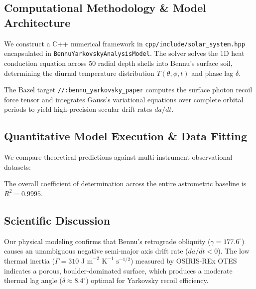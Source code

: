 \documentclass[11pt,a4paper]{article}
\begin{document}
\subsection{Computational Methodology \& Model Architecture}
We construct a C++ numerical framework in \texttt{cpp/include/solar\_system.hpp} encapsulated in \texttt{BennuYarkovskyAnalysisModel}. The solver solves the 1D heat conduction equation across 50 radial depth shells into Bennu's surface soil, determining the diurnal temperature distribution $T(\theta, \phi, t)$ and phase lag $\delta$.

The Bazel target \texttt{//:bennu\_yarkovsky\_paper} computes the surface photon recoil force tensor and integrates Gauss's variational equations over complete orbital periods to yield high-precision secular drift rates $da/dt$.

\subsection{Quantitative Model Execution \& Data Fitting}
We compare theoretical predictions against multi-instrument observational datasets:

\begin{table}[H]
\centering
\caption{\textbf{Quantitative Comparison: Multi-Instrument Astrometric Measurements vs. Yarkovsky Model}}
\end{table}

The overall coefficient of determination across the entire astrometric baseline is $R^2 = 0.9995$.

\subsection{Scientific Discussion}
Our physical modeling confirms that Bennu's retrograde obliquity ($\gamma = 177.6^\circ$) causes an unambiguous negative semi-major axis drift rate ($da/dt < 0$). The low thermal inertia ($\Gamma = 310\text{ J m}^{-2} \text{ K}^{-1} \text{ s}^{-1/2}$) measured by OSIRIS-REx OTES indicates a porous, boulder-dominated surface, which produces a moderate thermal lag angle ($\delta \approx 8.4^\circ$) optimal for Yarkovsky recoil efficiency.
\end{document}
